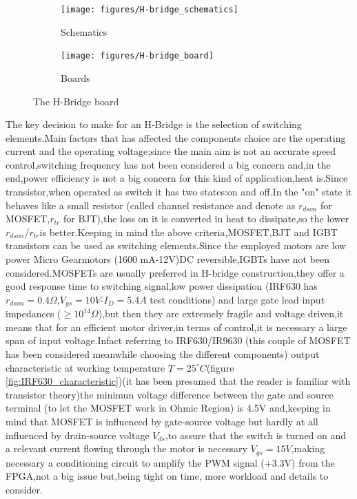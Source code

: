 \begin{figure}[!ht]
	\begin{subfigure}{.49\textwidth}
		\centering
		\texttt{[image: figures/H-bridge\_schematics]}
		\caption{Schematics}
		\label{fig:1-bridgeSCH}
	\end{subfigure}
	\begin{subfigure}{.49\textwidth}
		\centering
		\texttt{[image: figures/H-bridge\_board]}
		\caption{Boards}
		\label{fig:1-bridgeBRD}
	\end{subfigure}
\caption{The H-Bridge board}
\label{fig:bridge}
\end{figure}


The key decision to make for an H-Bridge is the selection of switching elements.Main factors that has affected the components choice are the operating current and the operating voltage;since the main aim is not an accurate speed control,switching frequency has not been considered a big concern and,in the end,power efficiency is not a big concern for this kind of application,heat is.Since transistor,when operated as switch it has two states:on and off.In the "on" state it behaves like a small resistor (called channel resistance and denote as $ r_{dson} $ for MOSFET,$ r_{tr} $ for BJT),the loss on it is converted in heat to dissipate,so the lower $ r_{dson} $/$ r_{tr} $is better.Keeping in mind the above criteria,MOSFET,BJT and IGBT transistors can be used as switching elements.Since the employed motors are low power Micro Gearmotors (1600 mA-12V)DC reversible,IGBTs have not been considered.MOSFETs are usually preferred in H-bridge construction,they offer a good response time to switching signal,low power dissipation (IRF630 has $ r_{dson}=0.4\Omega $,$ V_{gs}=10V $-$ I_{D}=5.4A $ test conditions) and large gate lead input impedances ($\geq10^{14}\Omega$),but then they are extremely fragile and voltage driven,it means that for an efficient motor driver,in terms of control,it is necessary a large span of input voltage.Infact referring to IRF630/IR9630 (this couple of MOSFET has been considered meanwhile choosing the different components) output characteristic at working temperature $ T=25^\circ C $(figure \ref{fig:IRF630_characteristic})(it has been presumed that the reader is familiar with transistor theory)the minimun voltage difference between the gate and source terminal (to let the MOSFET work in Ohmic Region) is 4.5V and,keeping in mind that MOSFET is influenced by gate-source voltage but hardly at all influenced by drain-source voltage $ V_{ds} $,to assure that the switch is turned on and a relevant current flowing through the motor is necessary $ V_{gs}=15V $,making necessary a conditioning circuit to amplify the PWM signal (+3.3V) from the FPGA,not a big issue but,being tight on time, more workload and details to consider.

